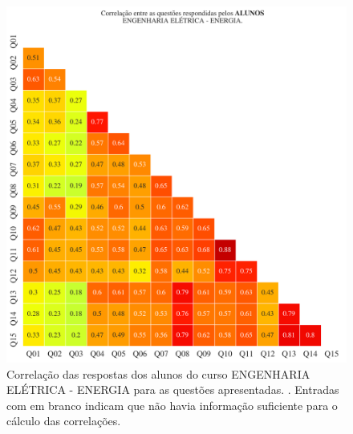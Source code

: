 \documentclass[a4paper,10pt]{article}
\begin{document}
\begin{figure}[h]
\centering
\includegraphics[width=0.999\linewidth]{matriz_corr__alunos_1109475.png}
\caption{\label{fig:corr_alunos}Correlação das respostas dos alunos do curso ENGENHARIA ELÉTRICA - ENERGIA para as questões apresentadas. . Entradas com em branco indicam que não havia informação suficiente para o cálculo das correlações.}
\end{figure}
\end{document}
